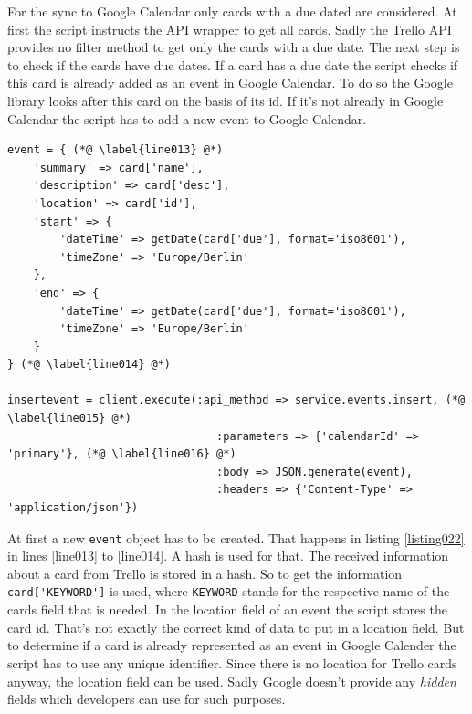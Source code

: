 For the sync to Google Calendar only cards with a due dated are considered. At first the script instructs the API wrapper to get all cards. Sadly the Trello API provides no filter method to get only the cards with a due date. The next step is to check if the cards have due dates. If a card has a due date the script checks if this card is already added as an event in Google Calendar. To do so the Google library looks after this card on the basis of its id. If it's not already in Google Calendar the script has to add a new event to Google Calendar.

\begin{lstlisting}[aboveskip=1\baselineskip, caption=Adding a new event to Google Calendar., label=listing022]
event = { (*@ \label{line013} @*)
	'summary' => card['name'],
	'description' => card['desc'],
	'location' => card['id'],
	'start' => {
		'dateTime' => getDate(card['due'], format='iso8601'),
		'timeZone' => 'Europe/Berlin'
	},
	'end' => {
		'dateTime' => getDate(card['due'], format='iso8601'),
		'timeZone' => 'Europe/Berlin'
	}
} (*@ \label{line014} @*)

insertevent = client.execute(:api_method => service.events.insert, (*@ \label{line015} @*)
								:parameters => {'calendarId' => 'primary'}, (*@ \label{line016} @*)
								:body => JSON.generate(event),
								:headers => {'Content-Type' => 'application/json'})
\end{lstlisting}

At first a new \lstinline{event} object has to be created. That happens in listing \ref{listing022} in lines \ref{line013} to \ref{line014}. A hash is used for that. The received information about a card from Trello is stored in a hash. So to get the information \lstinline{card['KEYWORD']} is used, where \lstinline{KEYWORD} stands for the respective name of the cards field that is needed. In the location field of an event the script stores the card id. That's not exactly the correct kind of data to put in a location field. But to determine if a card is already represented as an event in Google Calender the script has to use any unique identifier. Since there is no location for Trello cards anyway, the location field can be used. Sadly Google doesn't provide any \emph{hidden} fields which developers can use for such purposes.

